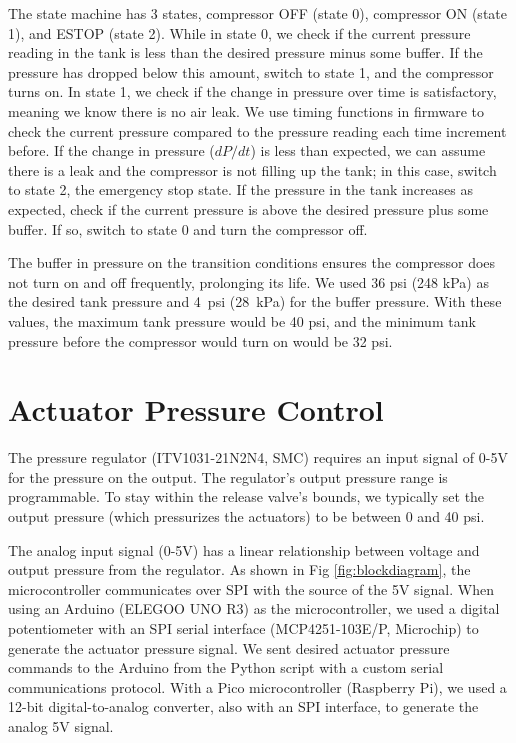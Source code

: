 The state machine has 3 states, compressor OFF (state 0), compressor ON (state 1), and ESTOP (state 2). While in state 0, we check if the current pressure reading in the tank is less than the desired pressure minus some buffer. If the pressure has dropped below this amount, switch to state 1, and the compressor turns on. In state 1, we check if the change in pressure over time is satisfactory, meaning we know there is no air leak. We use timing functions in firmware to check the current pressure compared to the pressure reading each time increment before. If the change in pressure ($dP/dt$) is less than expected, we can assume there is a leak and the compressor is not filling up the tank; in this case, switch to state 2, the emergency stop state. If the pressure in the tank increases as expected, check if the current pressure is above the desired pressure plus some buffer. If so, switch to state 0 and turn the compressor off. 

The buffer in pressure on the transition conditions ensures the compressor does not turn on and off frequently, prolonging its life. We used 36 psi (248 kPa) as the desired tank pressure and 4~psi (28~kPa) for the buffer pressure. With these values, the maximum tank pressure would be 40 psi, and the minimum tank pressure before the compressor would turn on would be 32 psi. 

\section{Actuator Pressure Control}

The pressure regulator (ITV1031-21N2N4, SMC) requires an input signal of 0-5V for the pressure on the output. The regulator's output pressure range is programmable. To stay within the release valve's bounds, we typically set the output pressure (which pressurizes the actuators) to be between 0 and 40 psi.  

The analog input signal (0-5V) has a linear relationship between voltage and output pressure from the regulator. As shown in Fig \ref{fig:blockdiagram}, the microcontroller communicates over SPI with the source of the 5V signal. When using an Arduino (ELEGOO UNO R3) as the microcontroller, we used a digital potentiometer with an SPI serial interface (MCP4251-103E/P, Microchip) to generate the actuator pressure signal. We sent desired actuator pressure commands to the Arduino from the Python script with a custom serial communications protocol. With a Pico microcontroller (Raspberry Pi), we used a 12-bit digital-to-analog converter, also with an SPI interface, to generate the analog 5V signal. 

